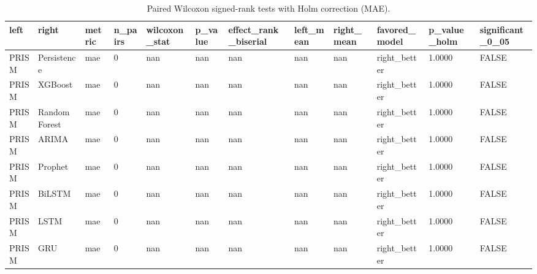 \begin{table}[htbp]
\centering
\begin{tabular}{llllllllllll}
\hline
left & right & metric & n_pairs & wilcoxon_stat & p_value & effect_rank_biserial & left_mean & right_mean & favored_model & p_value_holm & significant_0_05 \\
\hline
PRISM & Persistence & mae & 0 & nan & nan & nan & nan & nan & right_better & 1.0000 & FALSE \\
PRISM & XGBoost & mae & 0 & nan & nan & nan & nan & nan & right_better & 1.0000 & FALSE \\
PRISM & Random Forest & mae & 0 & nan & nan & nan & nan & nan & right_better & 1.0000 & FALSE \\
PRISM & ARIMA & mae & 0 & nan & nan & nan & nan & nan & right_better & 1.0000 & FALSE \\
PRISM & Prophet & mae & 0 & nan & nan & nan & nan & nan & right_better & 1.0000 & FALSE \\
PRISM & BiLSTM & mae & 0 & nan & nan & nan & nan & nan & right_better & 1.0000 & FALSE \\
PRISM & LSTM & mae & 0 & nan & nan & nan & nan & nan & right_better & 1.0000 & FALSE \\
PRISM & GRU & mae & 0 & nan & nan & nan & nan & nan & right_better & 1.0000 & FALSE \\
\hline
\end{tabular}
\caption{Paired Wilcoxon signed-rank tests with Holm correction (MAE).}
\label{table_statistical_tests}
\end{table}